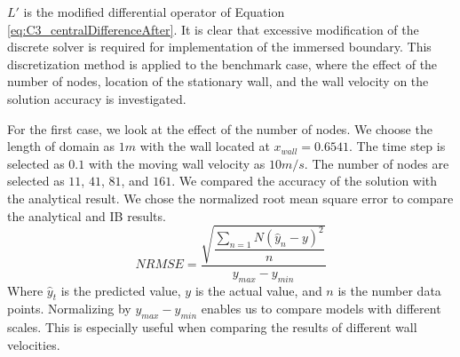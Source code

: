 %
$L'$ is the modified differential operator of Equation \eqref{eq:C3_centralDifferenceAfter}. It is clear that excessive modification of the discrete solver is required for implementation of the immersed boundary. This discretization method is applied to the benchmark case, where the effect of the number of nodes, location of the stationary wall, and the wall velocity on the solution accuracy is investigated.

For the first case, we look at the effect of the number of nodes. We choose the length of domain as $1m$ with the wall located at $x_{wall} = 0.6541$. The time step is selected as $0.1$ with the moving wall velocity as $10 m/s$. The number of nodes are selected as $11$, $41$, $81$, and $161$. We compared the accuracy of the solution with the analytical result. We chose the normalized root mean square error to compare the analytical and IB results.
%
\begin{equation*}
    NRMSE = \dfrac{\sqrt{\dfrac{\sum_{n=1}{N} \left( \hat{y}_n - y \right)^2}{n}}}{y_{max} - y_{min}}
\end{equation*}
%
Where $\hat{y}_t$ is the predicted value, $y$ is the actual value, and $n$ is the number data points. Normalizing by $y_{max} - y_{min}$ enables us to compare models with different scales. This is especially useful when comparing the results of different wall velocities.

